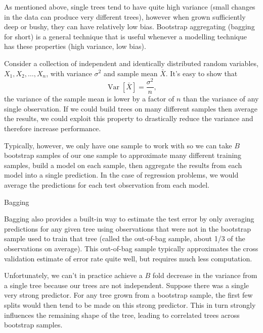 \documentclass[12pt]{article}
\begin{document}
As mentioned above, single trees tend to have quite high variance (small changes in the data can produce very different trees), however when grown sufficiently deep or bushy, they can have relatively low bias. Bootstrap aggregating (bagging for short) is a general technique that is useful whenever a modelling technique has these properties (high variance, low bias).

Consider a collection of independent and identically distributed random variables, $X_{1}, X_{2}, \ldots, X_{n}$, with variance $\sigma^2$ and sample mean $\bar{X}$. It's easy to show that
\begin{equation}
  \operatorname{Var}[\bar{X}] = \frac{\sigma^2}{n},
\end{equation}
the variance of the sample mean is lower by a factor of $n$ than the variance of any single observation. If we could build trees on many different samples then average the results, we could exploit this property to drastically reduce the variance and therefore increase performance.

Typically, however, we only have one sample to work with so we can take $B$ bootstrap samples of our one sample to approximate many different training samples, build a model on each sample, then aggregate the results from each model into a single prediction. In the case of regression problems, we would average the predictions for each test observation from each model.

\begin{algorithm}[ht]
 \caption{Bagging}
\end{algorithm}

Bagging also provides a built-in way to estimate the test error by only averaging predictions for any given tree using observations that were not in the bootstrap sample used to train that tree (called the out-of-bag sample, about 1/3 of the observations on average). This out-of-bag sample typically approximates the cross validation estimate of error rate quite well, but requires much less computation.

Unfortunately, we can't in practice achieve a $B$ fold decrease in the variance from a single tree because our trees are not independent. Suppose there was a single very strong predictor. For any tree grown from a bootstrap sample, the first few splits would then tend to be made on this strong predictor. This in turn strongly influences the remaining shape of the tree, leading to correlated trees across bootstrap samples.
\end{document}
